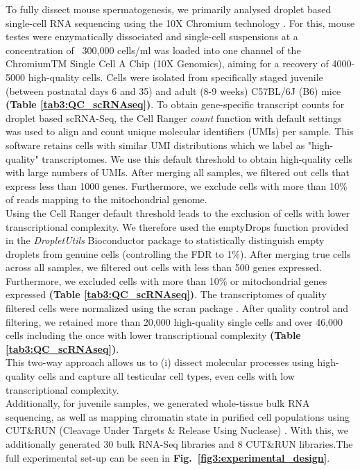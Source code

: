 
To fully dissect mouse spermatogenesis, we primarily analysed droplet based single-cell RNA sequencing using the 10X Chromium technology \citep{Zheng2017}. For this, mouse testes were enzymatically dissociated and single-cell suspensions at a concentration of ~300,000 cells/ml was loaded into one channel of the ChromiumTM Single Cell A Chip (10X Genomics), aiming for a recovery of 4000-5000 high-quality cells. Cells were isolated from specifically staged juvenile (between postnatal days 6 and 35) and adult (8-9 weeks) C57BL/6J (B6) mice \textbf{(Table \ref{tab3:QC_scRNAseq})}. To obtain gene-specific transcript counts for droplet based scRNA-Seq, the Cell Ranger \emph{count} function with default settings was used to align and count unique molecular identifiers (UMIs) per sample. This software retains cells with similar UMI distributions \citep{Zheng2017} which we label as "high-quality" transcriptomes. We use this default threshold to obtain high-quality cells with large numbers of UMIs. After merging all samples, we filtered out cells that express less than 1000 genes. Furthermore, we exclude cells with more than 10\% of reads mapping to the mitochondrial genome. \\
Using the Cell Ranger default threshold leads to the exclusion of cells with lower transcriptional complexity. We therefore used the emptyDrops function provided in the \emph{DropletUtils} Bioconductor package \citep{Lun2018} to statistically distinguish empty droplets from genuine cells (controlling the FDR to 1\%). After merging true cells across all samples, we filtered out cells with less than 500 genes expressed. Furthermore, we excluded cells with more than 10\% or mitochondrial genes expressed \textbf{(Table \ref{tab3:QC_scRNAseq})}. The transcriptomes of quality filtered cells were normalized using the scran package \citep{Lun2016pooling}. After quality control and filtering, we retained more than 20,000 high-quality single cells and over 46,000 cells including the once with lower transcriptional complexity \textbf{(Table \ref{tab3:QC_scRNAseq})}. \\
This two-way approach allows us to (i) dissect molecular processes using high-quality cells and capture all testicular cell types, even cells with low transcriptional complexity.\\

Additionally, for juvenile samples, we generated whole-tissue bulk RNA sequencing, as well as mapping chromatin state in purified cell populations using CUT\&{}RUN (Cleavage Under Targets \& Release Using Nuclease) \citep{Skene2018}. With this, we additionally generated 30 bulk RNA-Seq libraries and 8 CUT\&{}RUN libraries.The full experimental set-up can be seen in \textbf{Fig.~\ref{fig3:experimental_design}}.


